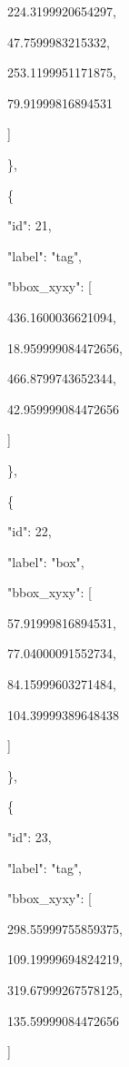 \documentclass[10pt,a4paper]{article}
\begin{document}
        224.3199920654297,\allowbreak{}\par
        47.7599983215332,\allowbreak{}\par
        253.1199951171875,\allowbreak{}\par
        79.91999816894531\par
      ]\par
    \},\allowbreak{}\par
    \{\par
      "id":\allowbreak{} 21,\allowbreak{}\par
      "label":\allowbreak{} "tag",\allowbreak{}\par
      "bbox\_xyxy":\allowbreak{} [\par
        436.1600036621094,\allowbreak{}\par
        18.959999084472656,\allowbreak{}\par
        466.8799743652344,\allowbreak{}\par
        42.959999084472656\par
      ]\par
    \},\allowbreak{}\par
    \{\par
      "id":\allowbreak{} 22,\allowbreak{}\par
      "label":\allowbreak{} "box",\allowbreak{}\par
      "bbox\_xyxy":\allowbreak{} [\par
        57.91999816894531,\allowbreak{}\par
        77.04000091552734,\allowbreak{}\par
        84.15999603271484,\allowbreak{}\par
        104.39999389648438\par
      ]\par
    \},\allowbreak{}\par
    \{\par
      "id":\allowbreak{} 23,\allowbreak{}\par
      "label":\allowbreak{} "tag",\allowbreak{}\par
      "bbox\_xyxy":\allowbreak{} [\par
        298.55999755859375,\allowbreak{}\par
        109.19999694824219,\allowbreak{}\par
        319.67999267578125,\allowbreak{}\par
        135.59999084472656\par
      ]\par
\end{document}
